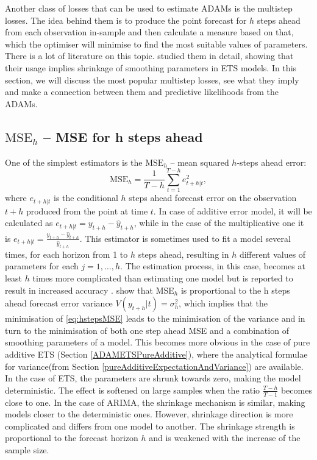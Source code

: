 \documentclass[
]{book}
\theoremstyle{definition}
\theoremstyle{definition}
\theoremstyle{definition}
\theoremstyle{definition}
\theoremstyle{remark}
\begin{document}
Another class of losses that can be used to estimate ADAMs is the multistep losses. The idea behind them is to produce the point forecast for \(h\) steps ahead from each observation in-sample and then calculate a measure based on that, which the optimiser will minimise to find the most suitable values of parameters. There is a lot of literature on this topic. \citet{Svetunkov2020Multistep} studied them in detail, showing that their usage implies shrinkage of smoothing parameters in ETS models. In this section, we will discuss the most popular multistep losses, see what they imply and make a connection between them and predictive likelihoods from the ADAMs.

\hypertarget{mathrmmse_h-mse-for-h-steps-ahead}{%
\subsection{\texorpdfstring{\(\mathrm{MSE}_h\) -- MSE for h steps ahead}{\textbackslash mathrm\{MSE\}\_h -- MSE for h steps ahead}}\label{mathrmmse_h-mse-for-h-steps-ahead}}

One of the simplest estimators is the \(\mathrm{MSE}_h\) -- mean squared \(h\)-steps ahead error:
\begin{equation}
    \mathrm{MSE}_h = \frac{1}{T-h} \sum_{t=1}^{T-h} e_{t+h|t}^2 ,
  \label{eq:hstepsMSE}
\end{equation}
where \(e_{t+h|t}\) is the conditional \(h\) steps ahead forecast error on the observation \(t+h\) produced from the point at time \(t\). In case of additive error model, it will be calculated as \(e_{t+h|t}=y_{t+h}-\hat{y}_{t+h}\), while in the case of the multiplicative one it is \(e_{t+h|t}=\frac{y_{t+h}-\hat{y}_{t+h}}{\hat{y}_{t+h}}\). This estimator is sometimes used to fit a model several times, for each horizon from 1 to \(h\) steps ahead, resulting in \(h\) different values of parameters for each \(j=1, \ldots, h\). The estimation process, in this case, becomes at least \(h\) times more complicated than estimating one model but is reported to result in increased accuracy \citep[see for example][]{kourentzes2019unconstraining}. \citet{Svetunkov2020Multistep} show that MSE\(_h\) is proportional to the h steps ahead forecast error variance \(V(y_{t+h}|t)=\sigma^2_{h}\), which implies that the minimisation of \eqref{eq:hstepsMSE} leads to the minimisation of the variance and in turn to the minimisation of both one step ahead MSE and a combination of smoothing parameters of a model. This becomes more obvious in the case of pure additive ETS (Section \ref{ADAMETSPureAdditive}), where the analytical formulae for variance(from Section \ref{pureAdditiveExpectationAndVariance}) are available. In the case of ETS, the parameters are shrunk towards zero, making the model deterministic. The effect is softened on large samples when the ratio \(\frac{T-h}{T-1}\) becomes close to one. In the case of ARIMA, the shrinkage mechanism is similar, making models closer to the deterministic ones. However, shrinkage direction is more complicated and differs from one model to another. The shrinkage strength is proportional to the forecast horizon \(h\) and is weakened with the increase of the sample size.
\end{document}
